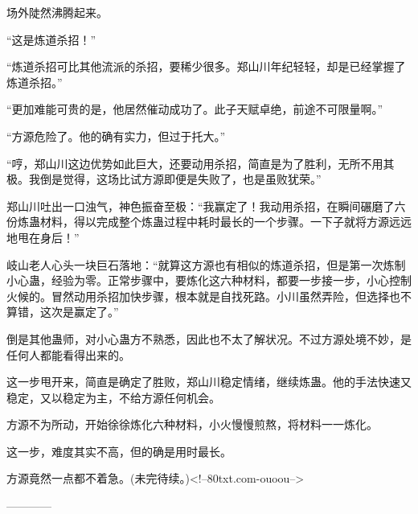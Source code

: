\begin{this_body}
场外陡然沸腾起来。

“这是炼道杀招！”

“炼道杀招可比其他流派的杀招，要稀少很多。郑山川年纪轻轻，却是已经掌握了炼道杀招。”

“更加难能可贵的是，他居然催动成功了。此子天赋卓绝，前途不可限量啊。”

“方源危险了。他的确有实力，但过于托大。”

“哼，郑山川这边优势如此巨大，还要动用杀招，简直是为了胜利，无所不用其极。我倒是觉得，这场比试方源即便是失败了，也是虽败犹荣。”

郑山川吐出一口浊气，神色振奋至极：“我赢定了！我动用杀招，在瞬间碾磨了六份炼蛊材料，得以完成整个炼蛊过程中耗时最长的一个步骤。一下子就将方源远远地甩在身后！”

岐山老人心头一块巨石落地：“就算这方源也有相似的炼道杀招，但是第一次炼制小心蛊，经验为零。正常步骤中，要炼化这六种材料，都要一步接一步，小心控制火候的。冒然动用杀招加快步骤，根本就是自找死路。小川虽然弄险，但选择也不算错，这次是赢定了。”

倒是其他蛊师，对小心蛊方不熟悉，因此也不太了解状况。不过方源处境不妙，是任何人都能看得出来的。

这一步甩开来，简直是确定了胜败，郑山川稳定情绪，继续炼蛊。他的手法快速又稳定，又以稳定为主，不给方源任何机会。

方源不为所动，开始徐徐炼化六种材料，小火慢慢煎熬，将材料一一炼化。

这一步，难度其实不高，但的确是用时最长。

方源竟然一点都不着急。(未完待续。)<!--80txt.com-ouoou-->

------------

\end{this_body}

